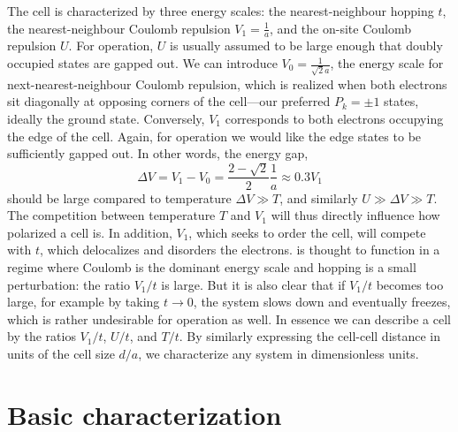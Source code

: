 The  cell is characterized by three energy scales: the
nearest-neighbour hopping $t$, the nearest-neighbour Coulomb repulsion $V_1 =
\frac{1}{a}$, and the on-site Coulomb repulsion $U$. For  operation,
$U$ is usually assumed to be large enough that doubly occupied states are gapped
out. We can introduce $V_0 = \frac{1}{\sqrt{2} a}$, the energy scale for
next-nearest-neighbour Coulomb repulsion, which is realized when both electrons
sit diagonally at opposing corners of the cell---our preferred $P_k=\pm1$
states, ideally the ground state. Conversely, $V_1$ corresponds to both
electrons occupying the edge of the cell. Again, for  operation we
would like the edge states to be sufficiently gapped out. In other words, the
energy gap, 
\begin{equation}
  \label{eq:deltaV}
  \Delta V = V_1 - V_0 = \frac{2 - \sqrt{2}}{2} \frac{1}{a} \approx 0.3 V_1
\end{equation}
should be large compared to temperature $\Delta V \gg T$, and similarly $U \gg
\Delta V \gg T$. The competition between temperature $T$ and $V_1$ will thus
directly influence how polarized a cell is. In addition, $V_1$, which seeks to
order the cell, will compete with $t$, which delocalizes and disorders the
electrons.  is thought to function in a regime where Coulomb is the
dominant energy scale and hopping is a small perturbation: the ratio $V_1/t$ is
large. But it is also clear that if $V_1/t$ becomes too large, for example by
taking $t \rightarrow 0$, the system slows down and eventually freezes, which is
rather undesirable for  operation as well. In essence we can describe
a cell by the ratios $V_1/t$, $U/t$, and $T/t$. By similarly expressing the
cell-cell distance in units of the cell size $d/a$, we characterize any
 system in dimensionless units.


\section{\label{sec:basic_characterization}Basic characterization}

